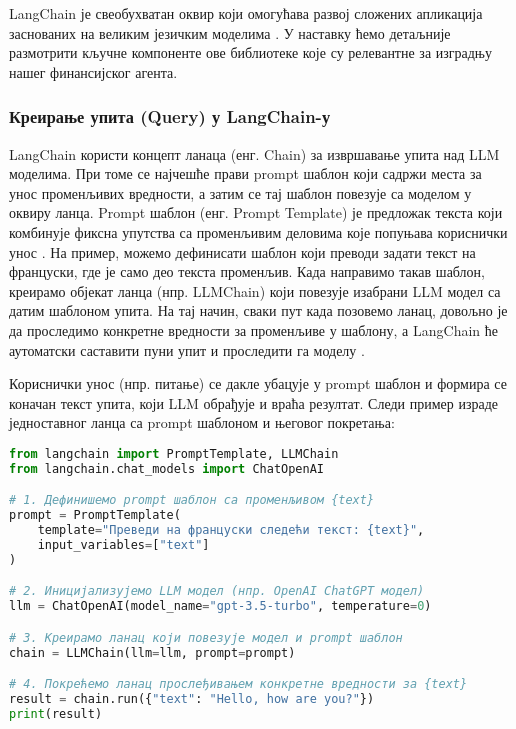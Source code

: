 LangChain је свеобухватан оквир који омогућава развој сложених апликација заснованих на великим језичким моделима \cite{langchain_docs_2024}. У наставку ћемо детаљније размотрити кључне компоненте ове библиотеке које су релевантне за изградњу нашег финансијског агента.

\subsubsection{Креирање упита (Query) у LangChain-у}

LangChain користи концепт ланаца (енг. Chain) за извршавање упита над LLM моделима. При томе се најчешће прави prompt шаблон који садржи места за унос променљивих вредности, а затим се тај шаблон повезује са моделом у оквиру ланца. Prompt шаблон (енг. Prompt Template) је предложак текста који комбинује фиксна упутства са променљивим деловима које попуњава кориснички унос \cite{langchain_docs_2024}. На пример, можемо дефинисати шаблон који преводи задати текст на француски, где је само део текста променљив. Када направимо такав шаблон, креирамо објекат ланца (нпр. LLMChain) који повезује изабрани LLM модел са датим шаблоном упита. На тај начин, сваки пут када позовемо ланац, довољно је да проследимо конкретне вредности за променљиве у шаблону, а LangChain ће аутоматски саставити пуни упит и проследити га моделу \cite{langchain_docs_2024}.

Кориснички унос (нпр. питање) се дакле убацује у prompt шаблон и формира се коначан текст упита, који LLM обрађује и враћа резултат. Следи пример израде једноставног ланца са prompt шаблоном и његовог покретања:

\begin{lstlisting}[language=Python, caption={Пример креирања ланца са prompt шаблоном}]
from langchain import PromptTemplate, LLMChain
from langchain.chat_models import ChatOpenAI

# 1. Дефинишемо prompt шаблон са променљивом {text}
prompt = PromptTemplate(
    template="Преведи на француски следећи текст: {text}",
    input_variables=["text"]
)

# 2. Иницијализујемо LLM модел (нпр. OpenAI ChatGPT модел)
llm = ChatOpenAI(model_name="gpt-3.5-turbo", temperature=0)

# 3. Креирамо ланац који повезује модел и prompt шаблон
chain = LLMChain(llm=llm, prompt=prompt)

# 4. Покрећемо ланац прослеђивањем конкретне вредности за {text}
result = chain.run({"text": "Hello, how are you?"})
print(result)
\end{lstlisting}

